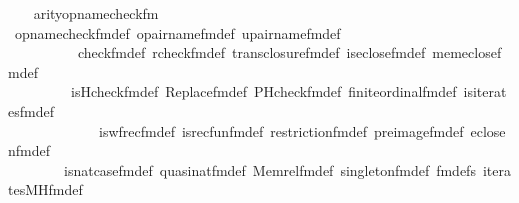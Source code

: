 \begin{isabellebody}
\ \ \isamarkupfalse%
\ {\isachardoublequoteopen}arity{\isacharparenleft}{\kern0pt}opname{\isacharunderscore}{\kern0pt}check{\isacharunderscore}{\kern0pt}fm{\isacharparenleft}{\kern0pt}{}{\isacharcomma}{\kern0pt}{}{\isacharcomma}{\kern0pt}{}{\isacharcomma}{\kern0pt}{}{\isacharparenright}{\kern0pt}{\isacharparenright}{\kern0pt}{\isacharequal}{\kern0pt}\ {}{\isachardoublequoteclose}\ \isanewline
\ \ \ \ \isamarkupfalse%
\ opname{\isacharunderscore}{\kern0pt}check{\isacharunderscore}{\kern0pt}fm{\isacharunderscore}{\kern0pt}def\ opair{\isacharunderscore}{\kern0pt}name{\isacharunderscore}{\kern0pt}fm{\isacharunderscore}{\kern0pt}def\ upair{\isacharunderscore}{\kern0pt}name{\isacharunderscore}{\kern0pt}fm{\isacharunderscore}{\kern0pt}def\isanewline
\ \ \ \ \ \ \ \ \ \ check{\isacharunderscore}{\kern0pt}fm{\isacharunderscore}{\kern0pt}def\ rcheck{\isacharunderscore}{\kern0pt}fm{\isacharunderscore}{\kern0pt}def\ trans{\isacharunderscore}{\kern0pt}closure{\isacharunderscore}{\kern0pt}fm{\isacharunderscore}{\kern0pt}def\ is{\isacharunderscore}{\kern0pt}eclose{\isacharunderscore}{\kern0pt}fm{\isacharunderscore}{\kern0pt}def\ mem{\isacharunderscore}{\kern0pt}eclose{\isacharunderscore}{\kern0pt}fm{\isacharunderscore}{\kern0pt}def\isanewline
\ \ \ \ \ \ \ \ \ is{\isacharunderscore}{\kern0pt}Hcheck{\isacharunderscore}{\kern0pt}fm{\isacharunderscore}{\kern0pt}def\ Replace{\isacharunderscore}{\kern0pt}fm{\isacharunderscore}{\kern0pt}def\ PHcheck{\isacharunderscore}{\kern0pt}fm{\isacharunderscore}{\kern0pt}def\ finite{\isacharunderscore}{\kern0pt}ordinal{\isacharunderscore}{\kern0pt}fm{\isacharunderscore}{\kern0pt}def\ is{\isacharunderscore}{\kern0pt}iterates{\isacharunderscore}{\kern0pt}fm{\isacharunderscore}{\kern0pt}def\isanewline
\ \ \ \ \ \ \ \ \ \ \ \ \ is{\isacharunderscore}{\kern0pt}wfrec{\isacharunderscore}{\kern0pt}fm{\isacharunderscore}{\kern0pt}def\ is{\isacharunderscore}{\kern0pt}recfun{\isacharunderscore}{\kern0pt}fm{\isacharunderscore}{\kern0pt}def\ restriction{\isacharunderscore}{\kern0pt}fm{\isacharunderscore}{\kern0pt}def\ pre{\isacharunderscore}{\kern0pt}image{\isacharunderscore}{\kern0pt}fm{\isacharunderscore}{\kern0pt}def\ eclose{\isacharunderscore}{\kern0pt}n{\isacharunderscore}{\kern0pt}fm{\isacharunderscore}{\kern0pt}def\isanewline
\ \ \ \ \ \ \ \ is{\isacharunderscore}{\kern0pt}nat{\isacharunderscore}{\kern0pt}case{\isacharunderscore}{\kern0pt}fm{\isacharunderscore}{\kern0pt}def\ quasinat{\isacharunderscore}{\kern0pt}fm{\isacharunderscore}{\kern0pt}def\ Memrel{\isacharunderscore}{\kern0pt}fm{\isacharunderscore}{\kern0pt}def\ singleton{\isacharunderscore}{\kern0pt}fm{\isacharunderscore}{\kern0pt}def\ fm{\isacharunderscore}{\kern0pt}defs\ iterates{\isacharunderscore}{\kern0pt}MH{\isacharunderscore}{\kern0pt}fm{\isacharunderscore}{\kern0pt}def\isanewline

\end{isabellebody}
